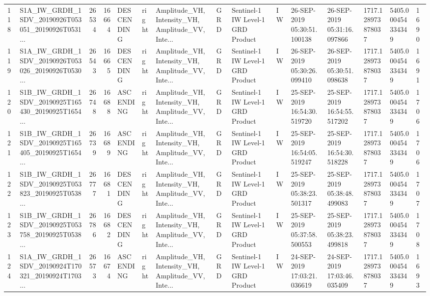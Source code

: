 \begin{tabular}{llrrlllllllllll}
118 &  S1A\_IW\_GRDH\_1SDV\_20190926T053051\_20190926T0531... &  26534 &   16664 &  DESCENDING &  right &  Amplitude\_VH, Intensity\_VH, Amplitude\_VV, Inte... &          GRD &  Sentinel-1 IW Level-1 GRD Product &              IW &  26-SEP-2019 05:30:51.100138 &  26-SEP-2019 05:31:16.097866 &          1717.128973878037 &  5405.000454334349 &       1690 \\
119 &  S1A\_IW\_GRDH\_1SDV\_20190926T053026\_20190926T0530... &  26543 &   16665 &  DESCENDING &  right &  Amplitude\_VH, Intensity\_VH, Amplitude\_VV, Inte... &          GRD &  Sentinel-1 IW Level-1 GRD Product &              IW &  26-SEP-2019 05:30:26.099410 &  26-SEP-2019 05:30:51.098638 &          1717.128973878037 &  5405.000454334349 &       1691 \\
120 &  S1B\_IW\_GRDH\_1SDV\_20190925T165430\_20190925T1654... &  26748 &   16688 &   ASCENDING &  right &  Amplitude\_VH, Intensity\_VH, Amplitude\_VV, Inte... &          GRD &  Sentinel-1 IW Level-1 GRD Product &              IW &  25-SEP-2019 16:54:30.519720 &  25-SEP-2019 16:54:55.517202 &          1717.128973878037 &  5405.000454334349 &       1706 \\
121 &  S1B\_IW\_GRDH\_1SDV\_20190925T165405\_20190925T1654... &  26739 &   16689 &   ASCENDING &  right &  Amplitude\_VH, Intensity\_VH, Amplitude\_VV, Inte... &          GRD &  Sentinel-1 IW Level-1 GRD Product &              IW &  25-SEP-2019 16:54:05.519247 &  25-SEP-2019 16:54:30.518228 &          1717.128973878037 &  5405.000454334349 &       1706 \\
122 &  S1B\_IW\_GRDH\_1SDV\_20190925T053823\_20190925T0538... &  26777 &   16681 &  DESCENDING &  right &  Amplitude\_VH, Intensity\_VH, Amplitude\_VV, Inte... &          GRD &  Sentinel-1 IW Level-1 GRD Product &              IW &  25-SEP-2019 05:38:23.501317 &  25-SEP-2019 05:38:48.499083 &          1717.128973878037 &  5405.000454334349 &       1707 \\
123 &  S1B\_IW\_GRDH\_1SDV\_20190925T053758\_20190925T0538... &  26786 &   16682 &  DESCENDING &  right &  Amplitude\_VH, Intensity\_VH, Amplitude\_VV, Inte... &          GRD &  Sentinel-1 IW Level-1 GRD Product &              IW &  25-SEP-2019 05:37:58.500553 &  25-SEP-2019 05:38:23.499818 &          1717.128973878037 &  5405.000454334349 &       1708 \\
124 &  S1A\_IW\_GRDH\_1SDV\_20190924T170321\_20190924T1703... &  26573 &   16674 &   ASCENDING &  right &  Amplitude\_VH, Intensity\_VH, Amplitude\_VV, Inte... &          GRD &  Sentinel-1 IW Level-1 GRD Product &              IW &  24-SEP-2019 17:03:21.036619 &  24-SEP-2019 17:03:46.035409 &          1717.128973878037 &  5405.000454334349 &       1693 \\

\end{tabular}
